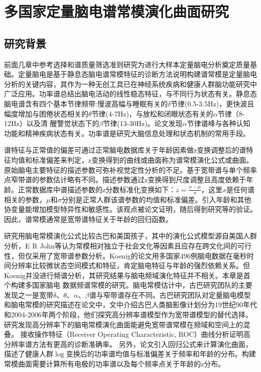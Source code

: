 \chapter{多国家定量脑电谱常模演化曲面研究}
\section{研究背景}
前面几章中参考选择和谱质量筛选准则研究为进行大样本定量脑电分析奠定质量基础。定量脑电是基于静息态脑电谱常模特征的诊断方法说明构建谱常模是定量脑电分析的关键内容，其作为一种无创工具已在神经系统疾病和健康人群脑功能研究中广泛应用。功率谱总结出脑电活动的线性稳态特征，与不同行为状态有关。静息态脑电谱含有四个基本节律频带:慢波高幅与睡眠有关的$\delta$节律(0.5-3.5Hz)，更快波且幅度增加与困倦状态相关的$\theta$节律(4-7Hz)，与放松和闭眼状态有关的$\alpha$节律（8-12Hz）以及清
醒警觉状态下的$\beta$节律(13-30Hz)。论文发现$\alpha$节律谱峰与各种认知功能和精神疾病状态有关。功率谱是研究大脑信息处理和状态机制的常用手段。

谱特征与正常值的偏差可通过正常脑电数据库关于年龄因素做z变换调整后的谱特征均值和标准偏差来判定，z变换得到的曲线或曲面称为谱常模演化公式或曲面。原始脑电主要特征的描述参数可弥补视觉定性分析的不足。基于宽带谱与单个频率点窄带谱的参数估计略有不同。描述参数通过z变换得到尺度调整且高度依赖于年龄。正常数据库中谱描述参数的z分数标准化变换如下：\(z=\frac{x-\mu}{\sigma}\)，这里$x$是任何谱相关的参数，$\mu$和$\sigma$分别是正常人群该谱参数的均值和标准偏差。引入年龄和其他协变量能增加模型特异性和敏感性。该观点被论文证明，随后得到研究等的验证。因此，谱常模通常是宽带谱特征关于年龄的回归函数。

研究用脑电常模演化公式比较古巴和美国孩子，其中的演化公式模型源自美国人群分析，E R John等认为常模相对独立于社会文化等因素且应存在跨文化间的可行性，但仅采用了宽带谱参数分析。Koenig的论文用多国家496例脑电数据在毫秒时间分辨率比较微状态空间模式和特征，肯定脑电特征与年龄的强烈依赖关系。但Koenig并没进行频谱分析，其研究结果与脑电频域演化特征并不相关。本章是首个构建多国家脑电
数据频谱常模的研究。脑电常模估计中，古巴研究团队的主要发现之一是宽带$\delta$、$\theta$、$\alpha$、$\beta$谱与窄带谱存在不同。古巴研究团队对定量脑电模型和脑电常模的研究描述在论文中，文中介绍古巴人类脑影像计划分为19世纪90年代和2004-2006年两个阶段，他们探究高分辨率谱模型作为宽带谱模型的替代选择。研究发现高分辨率下的脑电常模演化曲面能避免宽带谱常模在频域和空间上的混叠。 接收操作特征（Receiver Operating Characteristic, ROC）曲线分析证明高分辨率谱方法有更高的诊断准确率。 另外，论文引入回归公式来计算演化曲面，描述了健康人群$\log$变换后的功率谱均值与标准偏差关于频率和年龄的分布。构建常模曲面需要计算所有电极的功率谱以及每个频率点关于年龄的z分布。

